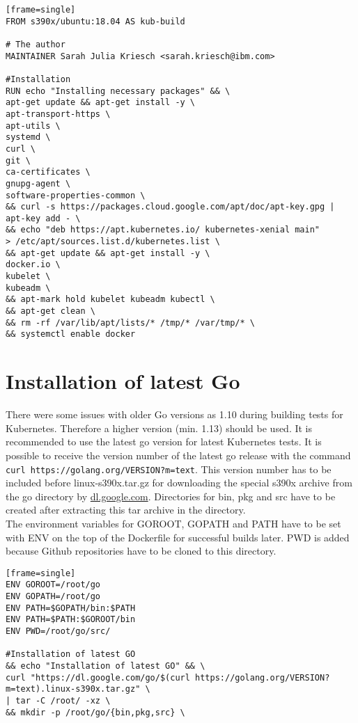\begin{verbatim}[frame=single]
FROM s390x/ubuntu:18.04 AS kub-build
 
# The author
MAINTAINER Sarah Julia Kriesch <sarah.kriesch@ibm.com>

#Installation
RUN echo "Installing necessary packages" && \
apt-get update && apt-get install -y \
apt-transport-https \
apt-utils \
systemd \
curl \
git \
ca-certificates \
gnupg-agent \
software-properties-common \
&& curl -s https://packages.cloud.google.com/apt/doc/apt-key.gpg | apt-key add - \
&& echo "deb https://apt.kubernetes.io/ kubernetes-xenial main" 
> /etc/apt/sources.list.d/kubernetes.list \
&& apt-get update && apt-get install -y \
docker.io \
kubelet \
kubeadm \
&& apt-mark hold kubelet kubeadm kubectl \
&& apt-get clean \
&& rm -rf /var/lib/apt/lists/* /tmp/* /var/tmp/* \
&& systemctl enable docker 
\end{verbatim}

\section{Installation of latest Go}

There were some issues with older Go versions as 1.10 during building tests for Kubernetes. Therefore a higher version (min. 1.13) should be used. It is recommended to use the latest go version for latest Kubernetes tests. It is possible to receive the version number of the latest go release with the command  \lstinline!curl https://golang.org/VERSION?m=text!. This version number has to be included before linux-s390x.tar.gz for downloading the special s390x archive from the go directory by \url{dl.google.com}. Directories for bin, pkg and src have to be created after extracting this tar archive in the  directory. \\

The environment variables for GOROOT, GOPATH and PATH have to be set with ENV on the top of the Dockerfile for successful builds later. PWD is added because Github repositories have to be cloned to this directory.

\begin{verbatim}[frame=single]
ENV GOROOT=/root/go
ENV GOPATH=/root/go
ENV PATH=$GOPATH/bin:$PATH
ENV PATH=$PATH:$GOROOT/bin
ENV PWD=/root/go/src/

#Installation of latest GO
&& echo "Installation of latest GO" && \
curl "https://dl.google.com/go/$(curl https://golang.org/VERSION?m=text).linux-s390x.tar.gz" \
| tar -C /root/ -xz \
&& mkdir -p /root/go/{bin,pkg,src} \
\end{verbatim}

